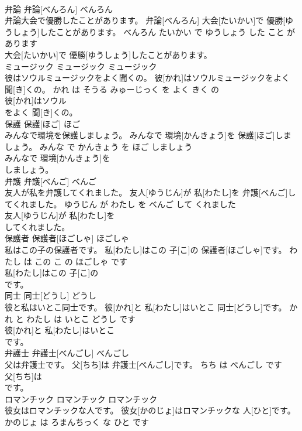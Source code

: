 \documentclass[8pt]{extreport}
\begin{document}
\begin{CJK}{UTF8}{min}
\\	弁論	弁論[べんろん]	べんろん	
\\	弁論大会で優勝したことがあります。	弁論[べんろん] 大会[たいかい]で 優勝[ゆうしょう]したことがあります。	べんろん たいかい で ゆうしょう した こと が あります	
\\	大会[たいかい]で 優勝[ゆうしょう]したことがあります。			
\\	ミュージック	ミュージック	ミュージック	
\\	彼はソウルミュージックをよく聞くの。	彼[かれ]はソウルミュージックをよく 聞[き]くの。	かれ は そうる みゅーじっく を よく きく の	
\\	彼[かれ]はソウル
\\	をよく 聞[き]くの。			
\\	保護	保護[ほご]	ほご	
\\	みんなで環境を保護しましょう。	みんなで 環境[かんきょう]を 保護[ほご]しましょう。	みんな で かんきょう を ほご しましょう	
\\	みんなで 環境[かんきょう]を
\\	しましょう。			
\\	弁護	弁護[べんご]	べんご	
\\	友人が私を弁護してくれました。	友人[ゆうじん]が 私[わたし]を 弁護[べんご]してくれました。	ゆうじん が わたし を べんご して くれました	
\\	友人[ゆうじん]が 私[わたし]を
\\	してくれました。			
\\	保護者	保護者[ほごしゃ]	ほごしゃ	
\\	私はこの子の保護者です。	私[わたし]はこの 子[こ]の 保護者[ほごしゃ]です。	わたし は この こ の ほごしゃ です	
\\	私[わたし]はこの 子[こ]の
\\	です。			
\\	同士	同士[どうし]	どうし	
\\	彼と私はいとこ同士です。	彼[かれ]と 私[わたし]はいとこ 同士[どうし]です。	かれ と わたし は いとこ どうし です	
\\	彼[かれ]と 私[わたし]はいとこ
\\	です。			
\\	弁護士	弁護士[べんごし]	べんごし	
\\	父は弁護士です。	父[ちち]は 弁護士[べんごし]です。	ちち は べんごし です	
\\	父[ちち]は
\\	です。			
\\	ロマンチック	ロマンチック	ロマンチック	
\\	彼女はロマンチックな人です。	彼女[かのじょ]はロマンチックな 人[ひと]です。	かのじょ は ろまんちっく な ひと です	

\end{CJK}
\end{document}
